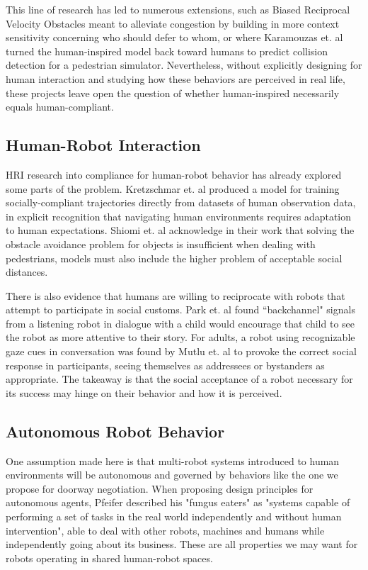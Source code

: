 \documentclass[letterpaper, 10 pt, conference]{ieeeconf}  %
\begin{document}
This line of research has led to numerous extensions, such as Biased Reciprocal Velocity Obstacles\cite{c4} meant to alleviate congestion by building in more context sensitivity concerning who should defer to whom, or where Karamouzas et. al\cite{c5} turned the human-inspired model back toward humans to predict collision detection for a pedestrian simulator. Nevertheless, without explicitly designing for human interaction and studying how these behaviors are perceived in real life, these projects leave open the question of whether human-inspired necessarily equals human-compliant.


\subsection{Human-Robot Interaction}

HRI research into compliance for human-robot behavior has already explored some parts of the problem. Kretzschmar et. al\cite{c6} produced a model for training socially-compliant trajectories directly from datasets of human observation data, in explicit recognition that navigating human environments requires adaptation to human expectations. Shiomi et. al\cite{c7} acknowledge in their work that solving the obstacle avoidance problem for objects is insufficient when dealing with pedestrians, models must also include the higher problem of acceptable social distances. 

There is also evidence that humans are willing to reciprocate with robots that attempt to participate in social customs. Park et. al\cite{c8} found ``backchannel" signals from a listening robot in dialogue with a child would encourage that child to see the robot as more attentive to their story. For adults, a robot using recognizable gaze cues in conversation was found by Mutlu et. al\cite{c9} to provoke the correct social response in participants, seeing themselves as addressees or bystanders as appropriate. The takeaway is that the social acceptance of a robot necessary for its success may hinge on their behavior and how it is perceived.


\subsection{Autonomous Robot Behavior}

One assumption made here is that multi-robot systems introduced to human environments will be autonomous and governed by behaviors like the one we propose for doorway negotiation. When proposing design principles for autonomous agents\cite{c10}, Pfeifer described his "fungus eaters" as "systems capable of performing a set of tasks in the real world independently and without human intervention", able to deal with other robots, machines and humans while independently going about its business. These are all properties we may want for robots operating in shared human-robot spaces.
\end{document}
